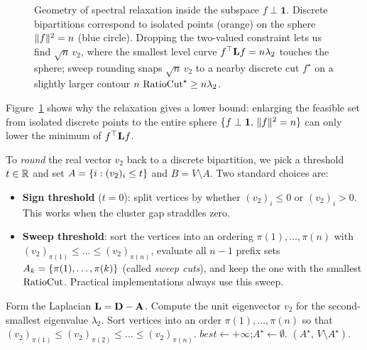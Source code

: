 \begin{figure}[htbp]
\caption{Geometry of spectral relaxation inside the subspace $f \perp \mathbf{1}$. Discrete bipartitions correspond to isolated points (orange) on the sphere $\lVert f\rVert^2 = n$ (blue circle). Dropping the two-valued constraint lets us find $\sqrt{n}\,v_2$, where the smallest level curve $f^\top\mathbf{L} f = n\lambda_2$ touches the sphere; sweep rounding snaps $\sqrt{n}\,v_2$ to a nearby discrete cut $f^\star$ on a slightly larger contour $n\,\operatorname{RatioCut}^\star \ge n\lambda_2$.}
\label{ch33:fig-relaxation-geom}
\end{figure}

Figure~\ref{ch33:fig-relaxation-geom} shows why the relaxation gives a lower bound: enlarging the feasible set from isolated discrete points to the entire sphere $\{f \perp \mathbf{1},\, \lVert f\rVert^2 = n\}$ can only lower the minimum of $f^\top \mathbf{L} f$.

To \emph{round} the real vector $v_2$ back to a discrete bipartition, we pick a threshold $t \in \mathbb{R}$
and set $A=\{i: (v_2)_i \le t\}$ and $B = V \setminus A$. Two standard choices are:
\begin{itemize}
  \item \textbf{Sign threshold} ($t=0$): split vertices by whether $(v_2)_i \le 0$ or $(v_2)_i > 0$. This works when the cluster gap straddles zero.
  \item \textbf{Sweep threshold}: sort the vertices into an ordering $\pi(1),\dots,\pi(n)$ with $(v_2)_{\pi(1)} \le \dots \le (v_2)_{\pi(n)}$, evaluate all $n-1$ prefix sets $A_k = \{\pi(1),\dots,\pi(k)\}$ (called \emph{sweep cuts}), and keep the one with the smallest $\operatorname{RatioCut}$. Practical implementations always use this sweep.
\end{itemize}

\begin{algorithm}[H]
\caption{\textsc{SpectralBisection}$(\Gph)$ -- Fiedler partition with sweep rounding}
\label{ch33:alg-bisection}
\DontPrintSemicolon
{}
Form the Laplacian $\mathbf{L} = \mathbf D - \mathbf{A}$.\;
Compute the unit eigenvector $v_2$ for the second-smallest eigenvalue $\lambda_2$.\;
Sort vertices into an order $\pi(1),\dots,\pi(n)$ so that $(v_2)_{\pi(1)} \le (v_2)_{\pi(2)} \le \dots \le (v_2)_{\pi(n)}$.\;
$best \gets +\infty$;\quad $A^\star\gets\emptyset$.\;
\Return $(A^\star,\, V\setminus A^\star)$.\;
\end{algorithm}

